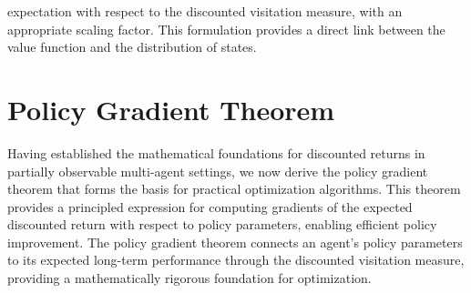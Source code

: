 \documentclass[a4paper,12pt]{report}
\begin{document}
expectation with respect to the discounted visitation measure, with an appropriate
scaling factor. This formulation provides a direct link between the value
function and the distribution of states.

\section{Policy Gradient Theorem}
Having established the mathematical foundations for discounted returns in
partially observable multi-agent settings, we now derive the policy gradient theorem
that forms the basis for practical optimization algorithms. This theorem
provides a principled expression for computing gradients of the expected
discounted return with respect to policy parameters, enabling efficient policy improvement.
The policy gradient theorem connects an agent's policy parameters to its
expected long-term performance through the discounted visitation measure, providing
a mathematically rigorous foundation for optimization.
\end{document}
